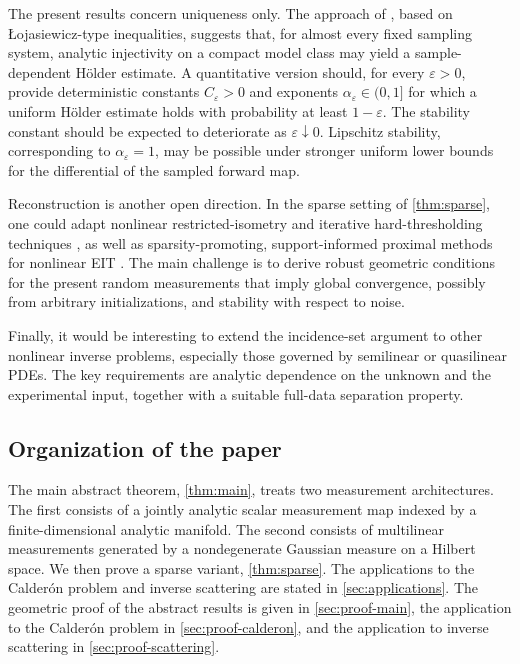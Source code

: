 \documentclass[11pt,oneside]{amsart}
\theoremstyle{plain}
\theoremstyle{definition}
\theoremstyle{remark}
\begin{document}
The present results concern uniqueness only. The approach of
 \cite{carstea2026h}, based on {\L}ojasiewicz-type inequalities,
suggests that, for almost every fixed sampling system, analytic injectivity
on a compact model class may yield a sample-dependent H\"older estimate. A
quantitative version should, for every $\varepsilon>0$, provide deterministic
constants $C_\varepsilon>0$ and exponents
$\alpha_\varepsilon\in(0,1]$ for which a uniform H\"older estimate holds with
probability at least $1-\varepsilon$. The stability constant should be
expected to deteriorate as $\varepsilon\downarrow0$. Lipschitz stability,
corresponding to $\alpha_\varepsilon=1$, may be possible under stronger
uniform lower bounds for the differential of the sampled forward map.

Reconstruction is another open direction. In the sparse setting of
\cref{thm:sparse}, one could adapt nonlinear restricted-isometry and
iterative hard-thresholding techniques \cite{blumensath2013compressed}, as
well as sparsity-promoting, support-informed proximal methods for nonlinear
EIT \cite{lazzaro2024oracle}. The main challenge is to derive robust
geometric conditions for the present random measurements that imply global
convergence, possibly from arbitrary initializations, and stability with
respect to noise.

Finally, it would be interesting to extend the incidence-set argument to
other nonlinear inverse problems, especially those governed by semilinear
or quasilinear PDEs. The key requirements are analytic dependence on the
unknown and the experimental input, together with a suitable full-data
separation property.

\subsection{Organization of the paper}
The main abstract theorem, \cref{thm:main}, treats two measurement architectures. The first consists of a jointly analytic scalar measurement map indexed by a finite-dimensional analytic manifold. The second consists of multilinear measurements generated by a nondegenerate Gaussian measure on a Hilbert space. We then prove a sparse variant, \cref{thm:sparse}. The applications to the Calder\'on problem and inverse scattering are stated in \cref{sec:applications}. The geometric proof of the abstract results is given in \cref{sec:proof-main}, the application to the Calder\'on problem in \cref{sec:proof-calderon}, and the application to inverse scattering  in \cref{sec:proof-scattering}.
\end{document}
